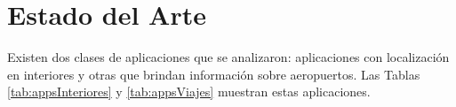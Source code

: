 
\chapter{Estado del Arte} %

\label{EstadoDelArte} %



Existen dos clases de aplicaciones que se analizaron: aplicaciones con localización en interiores y otras que brindan información sobre aeropuertos. Las Tablas \ref{tab:appsInteriores} y \ref{tab:appsViajes} muestran estas aplicaciones.


